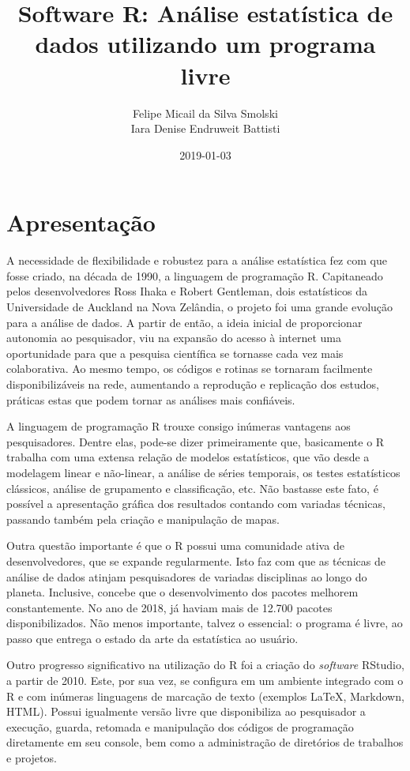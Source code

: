 \documentclass[12pt,brazil,oneside]{book}
\title{Software R: Análise estatística de dados utilizando um programa livre}
\author{Felipe Micail da Silva Smolski \\ Iara Denise Endruweit Battisti}
\date{2019-01-03}
\begin{document}
\maketitle

{
\setcounter{tocdepth}{1}
\tableofcontents
}
\hypertarget{apresentacao}{%
\chapter*{Apresentação}\label{apresentacao}}

A necessidade de flexibilidade e robustez para a análise estatística fez com que fosse criado, na década de 1990, a linguagem de programação R. Capitaneado pelos desenvolvedores Ross Ihaka e Robert Gentleman, dois estatísticos da Universidade de Auckland na Nova Zelândia, o projeto foi uma grande evolução para a análise de dados. A partir de então, a ideia inicial de proporcionar autonomia ao pesquisador, viu na expansão do acesso à internet uma oportunidade para que a pesquisa científica se tornasse cada vez mais colaborativa. Ao mesmo tempo, os códigos e rotinas se tornaram facilmente disponibilizáveis na rede, aumentando a reprodução e replicação dos estudos, práticas estas que podem tornar as análises mais confiáveis.

A linguagem de programação R trouxe consigo inúmeras vantagens aos pesquisadores. Dentre elas, pode-se dizer primeiramente que, basicamente o R trabalha com uma extensa relação de modelos estatísticos, que vão desde a modelagem linear e não-linear, a análise de séries temporais, os testes estatísticos clássicos, análise de grupamento e classificação, etc. Não bastasse este fato, é possível a apresentação gráfica dos resultados contando com variadas técnicas, passando também pela criação e manipulação de mapas.

Outra questão importante é que o R possui uma comunidade ativa de desenvolvedores, que se expande regularmente. Isto faz com que as técnicas de análise de dados atinjam pesquisadores de variadas disciplinas ao longo do planeta. Inclusive, concebe que o desenvolvimento dos pacotes melhorem constantemente. No ano de 2018, já haviam mais de 12.700 pacotes disponibilizados. Não menos importante, talvez o essencial: o programa é livre, ao passo que entrega o estado da arte da estatística ao usuário.

Outro progresso significativo na utilização do R foi a criação do \emph{software} RStudio, a partir de 2010. Este, por sua vez, se configura em um ambiente integrado com o R e com inúmeras linguagens de marcação de texto (exemplos LaTeX, Markdown, HTML). Possui igualmente versão livre que disponibiliza ao pesquisador a execução, guarda, retomada e manipulação dos códigos de programação diretamente em seu console, bem como a administração de diretórios de trabalhos e projetos.
\end{document}
